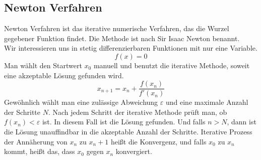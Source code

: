 \documentclass[a4paper,12pt]{llncs}
\numberwithin{equation}{section}
\begin{document}
\subsection{Newton Verfahren}
Newton Verfahren ist das iterative numerische Verfahren, das die Wurzel gegebener Funktion findet.
Die Methode ist nach Sir Isaac Newton benannt. \\
Wir interessieren uns in stetig differenzierbaren Funktionen mit nur eine Variable.
\[
f(x) = 0
\] 
Man wählt den Startwert $x_0$ manuell und benutzt die iterative Methode, soweit eine akzeptable Lösung gefunden wird.
\[
x_{n+1} = x_n + \frac{f(x_n)}{f'(x_n)}
\] 
Gewöhnlich wählt man eine zulässige Abweichung $\varepsilon$ und eine maximale Anzahl der Schritte $N$.
Nach jedem Schritt der iterative Methode prüft man, ob $f(x_n)  < \varepsilon$ ist. 
In diesem Fall ist die Lösung gefunden.
Und falls $n > N$, dann ist die Lösung unauffindbar in die akzeptable Anzahl der Schritte. 
Iterative Prozess der Annäherung von $x_n$ zu $x_n+1$ heißt die Konvergenz, und falls $x_0$ zu $x_n$ kommt, heißt das, dass $x_0$ gegen $x_n$ konvergiert.
\end{document}

